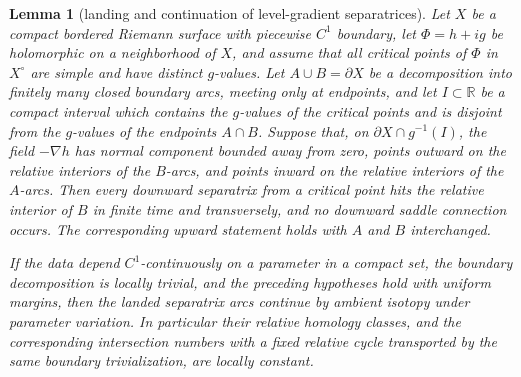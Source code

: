 \documentclass[10pt,a4paper]{amsart}
\newtheorem{lem}{Lemma}
\begin{document}
\begin{lem}[landing and continuation of level-gradient separatrices]\label{lem:gradient-landing}
Let $X$ be a compact bordered Riemann surface with piecewise $C^1$ boundary, let $\Phi=h+ig$ be holomorphic on a neighborhood of $X$, and assume that all critical points of $\Phi$ in $X^\circ$ are simple and have distinct $g$-values. Let $A\cup B=\partial X$ be a decomposition into finitely many closed boundary arcs, meeting only at endpoints, and let $I\subset\mathbb R$ be a compact interval which contains the $g$-values of the critical points and is disjoint from the $g$-values of the endpoints $A\cap B$. Suppose that, on $\partial X\cap g^{-1}(I)$, the field $-\nabla h$ has normal component bounded away from zero, points outward on the relative interiors of the $B$-arcs, and points inward on the relative interiors of the $A$-arcs. Then every downward separatrix from a critical point hits the relative interior of $B$ in finite time and transversely, and no downward saddle connection occurs. The corresponding upward statement holds with $A$ and $B$ interchanged.

If the data depend $C^1$-continuously on a parameter in a compact set, the boundary decomposition is locally trivial, and the preceding hypotheses hold with uniform margins, then the landed separatrix arcs continue by ambient isotopy under parameter variation. In particular their relative homology classes, and the corresponding intersection numbers with a fixed relative cycle transported by the same boundary trivialization, are locally constant.
\end{lem}
\end{document}
